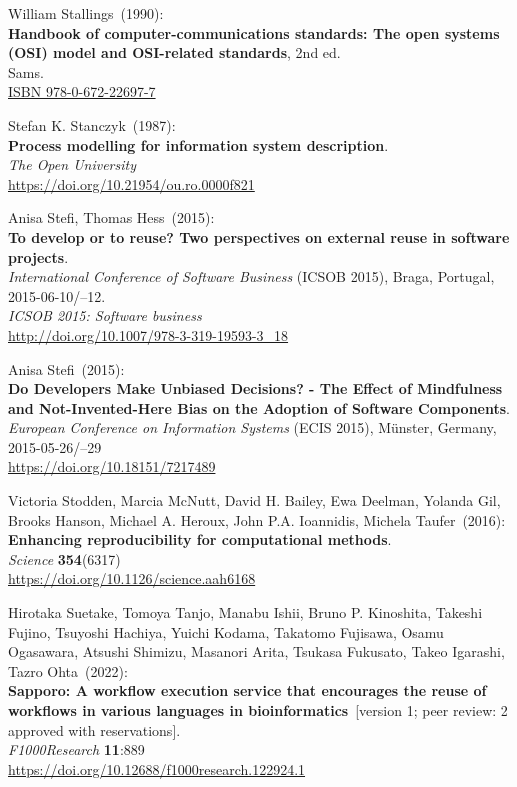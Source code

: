 \begin{thebibliography}{9}
William Stallings~(1990): \\
\textbf{Handbook of computer-communications standards: {The} open systems ({OSI}) model and {OSI-related} standards}, 2nd ed. \\
Sams.\\
\href{https://identifiers.org/isbn/9780672226977}{ISBN 978-0-672-22697-7}
 
Stefan K. Stanczyk~(1987): \\
\textbf{Process modelling for information system description}.\\
\emph{The Open University} \\
\url{https://doi.org/10.21954/ou.ro.0000f821}

Anisa Stefi, Thomas Hess~(2015): \\
\textbf{To develop or to reuse? Two perspectives on external reuse in software projects}. \\
\emph{International Conference of Software Business} (ICSOB 2015), Braga, Portugal, 2015-06-10/--12.\\
\emph{ICSOB 2015: Software business} \\
\url{http://doi.org/10.1007/978-3-319-19593-3_18}

Anisa Stefi~(2015): \\
\textbf{Do Developers Make Unbiased Decisions? - The Effect of Mindfulness and Not-Invented-Here Bias on the Adoption of Software Components}. \\
\emph{European Conference on Information Systems} (ECIS 2015), Münster, Germany, 2015-05-26/--29 \\
\url{https://doi.org/10.18151/7217489}

Victoria Stodden, Marcia McNutt, David H. Bailey, Ewa Deelman, Yolanda Gil, Brooks Hanson, Michael A. Heroux, John P.A. Ioannidis, Michela Taufer~(2016): \\
\textbf{Enhancing reproducibility for computational methods}.\\
\emph{Science} \textbf{354}(6317) \\
\url{https://doi.org/10.1126/science.aah6168}

Hirotaka Suetake, Tomoya Tanjo, Manabu Ishii, Bruno P. Kinoshita, Takeshi Fujino, Tsuyoshi Hachiya, Yuichi Kodama, Takatomo Fujisawa, Osamu Ogasawara, Atsushi Shimizu, Masanori Arita, Tsukasa Fukusato, Takeo Igarashi, Tazro Ohta~(2022): \\
\textbf{Sapporo: A workflow execution service that encourages the reuse of workflows in various languages in bioinformatics}~[version 1; peer review: 2 approved with reservations].\\
\emph{F1000Research} \textbf{11}:889\\
\url{https://doi.org/10.12688/f1000research.122924.1}


\end{thebibliography}
